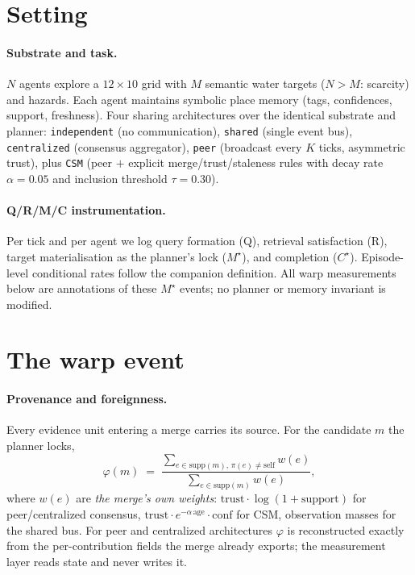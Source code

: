 \documentclass{article}
\newcommand{\method}[1]{\texttt{#1}}
\newcommand{\mstar}{M^{\star}}
\newcommand{\cstar}{C^{\star}}
\begin{document}
\section{Setting}
\label{sec:setting}

\paragraph{Substrate and task.} $N$ agents explore a $12\times10$ grid
with $M$ semantic water targets ($N>M$: scarcity) and hazards. Each
agent maintains symbolic place memory (tags, confidences, support,
freshness). Four sharing architectures over the identical substrate
and planner: \method{independent} (no communication),
\method{shared} (single event bus), \method{centralized} (consensus
aggregator), \method{peer} (broadcast every $K$ ticks, asymmetric
trust), plus \method{CSM} (peer $+$ explicit merge/trust/staleness
rules with decay rate $\alpha{=}0.05$ and inclusion threshold
$\tau{=}0.30$). %

\paragraph{Q/R/M/C instrumentation.} Per tick and per agent we log
query formation (Q), retrieval satisfaction (R), target
materialisation as the planner's lock ($\mstar$), and completion
($\cstar$). Episode-level conditional rates follow the companion
definition. All warp measurements below are annotations of these
$\mstar$ events; no planner or memory invariant is modified.

\section{The warp event}
\label{sec:warp-def}

\paragraph{Provenance and foreignness.} Every evidence unit entering a
merge carries its source. For the candidate $m$ the planner locks,
\[
\varphi(m) \;=\;
\frac{\sum_{e\in\mathrm{supp}(m),\,\pi(e)\neq\mathrm{self}} w(e)}
     {\sum_{e\in\mathrm{supp}(m)} w(e)},
\]
where $w(e)$ are \emph{the merge's own weights}: $\text{trust}\cdot
\log(1{+}\text{support})$ for peer/centralized consensus,
$\text{trust}\cdot e^{-\alpha\,\text{age}}\cdot\text{conf}$ for CSM,
observation masses for the shared bus. For peer and centralized
architectures $\varphi$ is reconstructed exactly from the
per-contribution fields the merge already exports; the measurement
layer reads state and never writes it.
\end{document}
